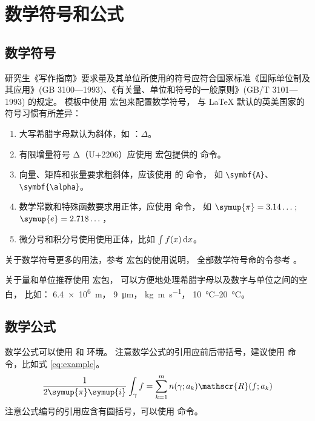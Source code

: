 
\chapter{数学符号和公式}

\section{数学符号}

研究生《写作指南》要求量及其单位所使用的符号应符合国家标准《国际单位制及其应用》(GB 3100—1993)、《有关量、单位和符号的一般原则》(GB/T 3101—1993) 的规定。
模板中使用  宏包来配置数学符号，
与 \LaTeX{} 默认的英美国家的符号习惯有所差异：
\begin{enumerate}
  \item 大写希腊字母默认为斜体，如 ：$\Delta$。
  \item 有限增量符号 $\increment$（U+2206）应使用  宏包提供的
         命令。
  \item 向量、矩阵和张量要求粗斜体，应该使用  的  命令，
        如 \verb|\symbf{A}|、\verb|\symbf{\alpha}|。
  \item 数学常数和特殊函数要求用正体，应使用  命令，
        如 $\symup{\pi} = 3.14\dots$; $\symup{e} = 2.718\dots$，
  \item 微分号和积分号使用使用正体，比如 $\int f(x) \mathop{}\!\mathrm{d} x$。
\end{enumerate}

关于数学符号更多的用法，参考
\href{http://mirrors.ctan.org/macros/latex/contrib/unicode-math/unicode-math.pdf}{}
宏包的使用说明，
全部数学符号命的令参考
\href{http://mirrors.ctan.org/macros/latex/contrib/unicode-math/unimath-symbols.pdf}{}。

关于量和单位推荐使用
\href{http://mirrors.ctan.org/macros/latex/contrib/siunitx/siunitx.pdf}{}
宏包，
可以方便地处理希腊字母以及数字与单位之间的空白，
比如：
\SI{6.4e6}{m}，
\SI{9}{\micro\meter}，
\si{kg.m.s^{-1}}，
\SIrange{10}{20}{\degreeCelsius}。



\section{数学公式}

数学公式可以使用  和  环境。
注意数学公式的引用应前后带括号，建议使用  命令，比如式 \eqref{eq:example}。
\begin{equation}
  \frac{1}{2 \symup{\pi} \symup{i}} \int_\gamma f = \sum_{k=1}^m n(\gamma; a_k) \mathscr{R}(f; a_k)
  \label{eq:example}
\end{equation}
注意公式编号的引用应含有圆括号，可以使用  命令。

